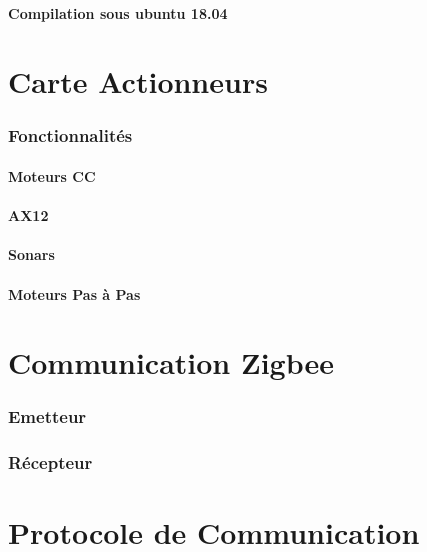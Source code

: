 \documentclass{article}
\begin{document}
			\subsection{Compilation sous ubuntu 18.04}
	\newpage
	\part{Carte Actionneurs}
	\setcounter{section}{0}
		\section{Fonctionnalités}
			\subsection{Moteurs CC}
			\subsection{AX12}
			\subsection{Sonars}
			\subsection{Moteurs Pas à Pas}

		\section{}
	\newpage
	\part{Communication Zigbee}
	\setcounter{section}{0}
		\section{Emetteur}
			\subsection{}
		\section{Récepteur}

	\part{Protocole de Communication}
			
		
	
	
\end{document}
